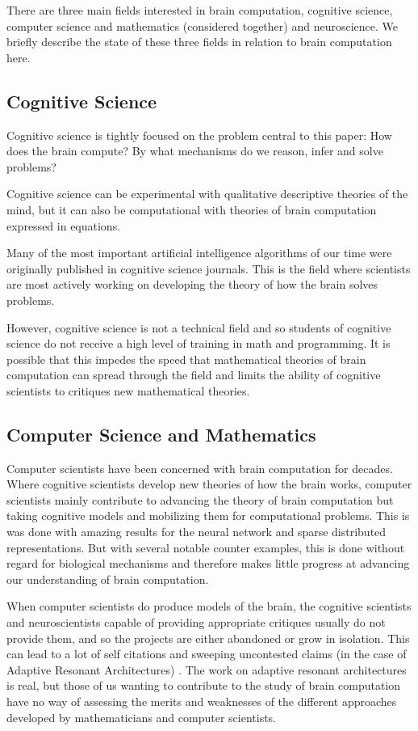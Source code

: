 \documentclass{article}
\begin{document}
There are three main fields interested in brain computation, cognitive science, computer science and mathematics (considered together) and neuroscience. We briefly describe the state of these three fields in relation to brain computation here.

\subsection*{Cognitive Science}

Cognitive science is tightly focused on the problem central to this paper: How does the brain compute? By what mechanisms do we reason, infer and solve problems?

Cognitive science can be experimental with qualitative descriptive theories of the mind, but it can also be computational with theories of brain computation expressed in equations.

Many of the most important artificial intelligence algorithms of our time were originally published in cognitive science journals. This is the field where scientists are most actively working on developing the theory of how the brain solves problems.

However, cognitive science is not a technical field and so students of cognitive science do not receive a high level of training in math and programming. It is possible that this impedes the speed that mathematical theories of brain computation can spread through the field and limits the ability of cognitive scientists to critiques new mathematical theories.

\subsection*{Computer Science and Mathematics}

Computer scientists have been concerned with brain computation for decades. Where cognitive scientists develop new theories of how the brain works, computer scientists mainly contribute to advancing the theory of brain computation but taking cognitive models and mobilizing them for computational problems. This is was done with amazing results for the neural network and sparse distributed representations. But with several notable counter examples, this is done without regard for biological mechanisms and therefore makes little progress at advancing our understanding of brain computation.

When computer scientists do produce models of the brain, the cognitive scientists and neuroscientists capable of providing appropriate critiques usually do not provide them, and so the projects are either abandoned or grow in isolation. This can lead to a lot of self citations and sweeping uncontested claims (in the case of Adaptive Resonant Architectures) \cite{Grossberg2012}. The work on adaptive resonant architectures is real, but those of us wanting to contribute to the study of brain computation have no way of assessing the merits and weaknesses of the different approaches developed by mathematicians and computer scientists.
\end{document}
